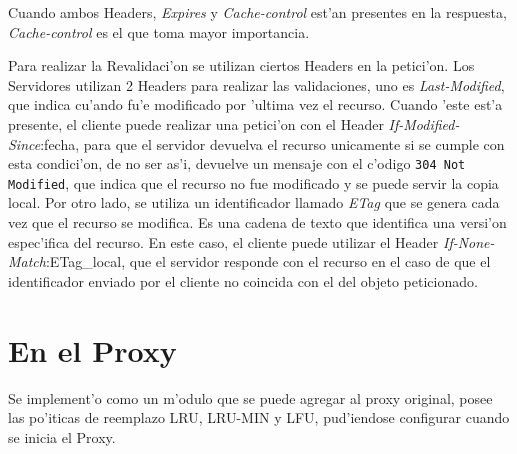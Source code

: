 Cuando ambos Headers, \textsl{Expires} y \textsl{Cache-control} est'an presentes en la respuesta, \textsl{Cache-control} es el que toma mayor importancia.

Para realizar la Revalidaci'on se utilizan ciertos Headers en la petici'on. Los Servidores utilizan 2 Headers para realizar las validaciones, uno es \textsl{Last-Modified}, que indica cu'ando fu'e modificado por 'ultima vez el recurso. Cuando 'este est'a presente, el cliente puede realizar una petici'on con el Header \textsl{If-Modified-Since}:fecha, para que el servidor devuelva el recurso unicamente si se cumple con esta condici'on, de no ser as'i, devuelve un mensaje con el c'odigo \texttt{304 Not Modified}, que indica que el recurso no fue modificado y se puede servir la copia local.
Por otro lado, se utiliza un identificador llamado \textsl{ETag} que se genera cada vez que el recurso se modifica. Es una cadena de texto que identifica una versi'on espec'ifica del recurso. En este caso, el cliente puede utilizar el Header \textsl{If-None-Match}:ETag\_local, que el servidor responde con el recurso en el caso de que el identificador enviado por el cliente no coincida con el del objeto peticionado.

\section{En el Proxy}

Se implement'o como un m'odulo que se puede agregar al proxy original, posee las po'iticas de reemplazo LRU, LRU-MIN y LFU, pud'iendose configurar cuando se inicia el Proxy.